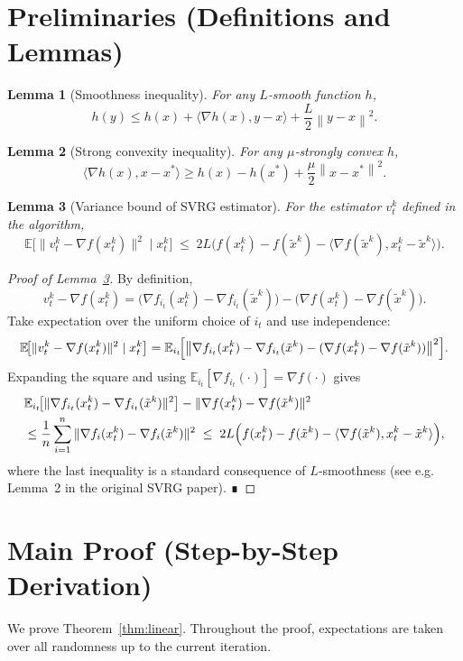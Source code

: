 \documentclass{article}
\newtheorem{lemma}{Lemma}
\newcommand{\E}{\mathbb{E}}
\newcommand{\norm}[1]{\left\|#1\right\|}
\newcommand{\inner}[2]{\langle #1,#2\rangle}
\begin{document}
\newpage
\section*{Preliminaries (Definitions and Lemmas)}
\begin{lemma}[Smoothness inequality]\label{lem:smooth}
For any $L$‑smooth function $h$,
\[
h(y)\le h(x)+\inner{\nabla h(x)}{y-x}+\frac{L}{2}\norm{y-x}^{2}.
\]
\end{lemma}
\begin{lemma}[Strong convexity inequality]\label{lem:strong}
For any $\mu$‑strongly convex $h$,
\[
\inner{\nabla h(x)}{x-x^{*}}\ge h(x)-h(x^{*})+\frac{\mu}{2}\norm{x-x^{*}}^{2}.
\]
\end{lemma}
\begin{lemma}[Variance bound of SVRG estimator]\label{lem:var}
For the estimator $v_t^{k}$ defined in the algorithm,
\[
\E\!\bigl[\|v_t^{k}-\nabla f(x_t^{k})\|^{2}\mid x_t^{k}\bigr]
\;\le\;2L\bigl(f(x_t^{k})-f(\tilde{x}^{k})- \inner{\nabla f(\tilde{x}^{k})}{x_t^{k}-\tilde{x}^{k}}\bigr).
\]
\end{lemma}
\begin{proof}[Proof of Lemma~\ref{lem:var}]
By definition,
\[
v_t^{k}-\nabla f(x_t^{k})
=
\bigl(\nabla f_{i_t}(x_t^{k})-\nabla f_{i_t}(\tilde{x}^{k})\bigr)
-\bigl(\nabla f(x_t^{k})-\nabla f(\tilde{x}^{k})\bigr).
\]
Take expectation over the uniform choice of $i_t$ and use independence:
\[
\E\!\bigl[\|v_t^{k}-\nabla f(x_t^{k})\|^{2}\mid x_t^{k}\bigr]
=
\E_{i_t}\!\Bigl[\bigl\|\nabla f_{i_t}(x_t^{k})-\nabla f_{i_t}(\tilde{x}^{k})
 -(\nabla f(x_t^{k})-\nabla f(\tilde{x}^{k}))\bigr\|^{2}\Bigr].
\]
Expanding the square and using $\E_{i_t}[\nabla f_{i_t}(\cdot)]=\nabla f(\cdot)$ gives
\[
\begin{aligned}
&\E_{i_t}\!\bigl[\|\nabla f_{i_t}(x_t^{k})-\nabla f_{i_t}(\tilde{x}^{k})\|^{2}\bigr]
-\|\nabla f(x_t^{k})-\nabla f(\tilde{x}^{k})\|^{2}\\
&\le\frac1n\sum_{i=1}^{n}\|\nabla f_i(x_t^{k})-\nabla f_i(\tilde{x}^{k})\|^{2}
\;\le\;2L\Bigl(f(x_t^{k})-f(\tilde{x}^{k})-\inner{\nabla f(\tilde{x}^{k})}{x_t^{k}-\tilde{x}^{k}}\Bigr),
\end{aligned}
\]
where the last inequality is a standard consequence of $L$‑smoothness (see e.g. Lemma~2 in the original SVRG paper). ∎
\end{proof}

\newpage
\section*{Main Proof (Step-by-Step Derivation)}
We prove Theorem~\ref{thm:linear}.  Throughout the proof, expectations are taken over all randomness up to the current iteration.
\end{document}
